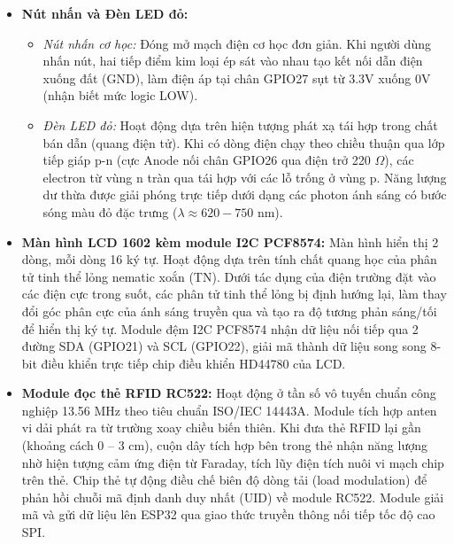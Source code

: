 \begin{itemize}[leftmargin=0.8cm]
    \item \textbf{Nút nhấn và Đèn LED đỏ:}
    \begin{itemize}
        \item \textit{Nút nhấn cơ học:} Đóng mở mạch điện cơ học đơn giản. Khi người dùng nhấn nút, hai tiếp điểm kim loại ép sát vào nhau tạo kết nối dẫn điện xuống đất (GND), làm điện áp tại chân GPIO27 sụt từ 3.3V xuống 0V (nhận biết mức logic LOW).
        \item \textit{Đèn LED đỏ:} Hoạt động dựa trên hiện tượng phát xạ tái hợp trong chất bán dẫn (quang điện tử). Khi có dòng điện chạy theo chiều thuận qua lớp tiếp giáp p-n (cực Anode nối chân GPIO26 qua điện trở 220 $\Omega$), các electron từ vùng n tràn qua tái hợp với các lỗ trống ở vùng p. Năng lượng dư thừa được giải phóng trực tiếp dưới dạng các photon ánh sáng có bước sóng màu đỏ đặc trưng ($\lambda \approx 620 - 750$ nm).
    \end{itemize}

    \item \textbf{Màn hình LCD 1602 kèm module I2C PCF8574:}
    Màn hình hiển thị 2 dòng, mỗi dòng 16 ký tự. Hoạt động dựa trên tính chất quang học của phân tử tinh thể lỏng nematic xoắn (TN). Dưới tác dụng của điện trường đặt vào các điện cực trong suốt, các phân tử tinh thể lỏng bị định hướng lại, làm thay đổi góc phân cực của ánh sáng truyền qua và tạo ra độ tương phản sáng/tối để hiển thị ký tự. Module đệm I2C PCF8574 nhận dữ liệu nối tiếp qua 2 đường SDA (GPIO21) và SCL (GPIO22), giải mã thành dữ liệu song song 8-bit điều khiển trực tiếp chip điều khiển HD44780 của LCD.

    \item \textbf{Module đọc thẻ RFID RC522:}
    Hoạt động ở tần số vô tuyến chuẩn công nghiệp 13.56 MHz theo tiêu chuẩn ISO/IEC 14443A. Module tích hợp anten vi dải phát ra từ trường xoay chiều biến thiên. Khi đưa thẻ RFID lại gần (khoảng cách 0 – 3 cm), cuộn dây tích hợp bên trong thẻ nhận năng lượng nhờ hiện tượng cảm ứng điện từ Faraday, tích lũy điện tích nuôi vi mạch chip trên thẻ. Chip thẻ tự động điều chế biên độ dòng tải (load modulation) để phản hồi chuỗi mã định danh duy nhất (UID) về module RC522. Module giải mã và gửi dữ liệu lên ESP32 qua giao thức truyền thông nối tiếp tốc độ cao SPI.
\end{itemize}
